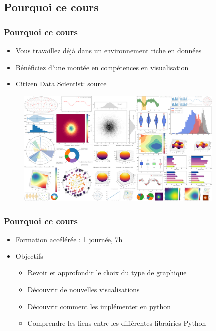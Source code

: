 \subsection{Pourquoi ce cours}
\begin{frame}\frametitle{Pourquoi ce cours}
   \begin{itemize}
      \item Vous travaillez déjà dans un environnement riche en données
      \item Bénéficiez d'une montée en compétences en visualisation  
      \item Citizen Data Scientist: \href{https://www.forbes.fr/business/les-citizen-data-scientists-donner-des-competences-techniques-aux-experts-metier/}{source}
   \end{itemize}
   \begin{figure}[H]
      \includegraphics[width=10cm]{images/illustrations/viz_cheat_sheet.png}
   \end{figure}
\end{frame}

\begin{frame}\frametitle{Pourquoi ce cours}
   \begin{itemize}
      \item Formation accélérée : 1 journée, 7h 
      \item Objectifs
      \begin{itemize}
         \item Revoir et approfondir le choix du type de graphique
         \item Découvrir de nouvelles visualisations
         \item Découvrir comment les implémenter en python
         \item Comprendre les liens entre les différentes librairies Python
      \end{itemize}
   \end{itemize}
\end{frame}


